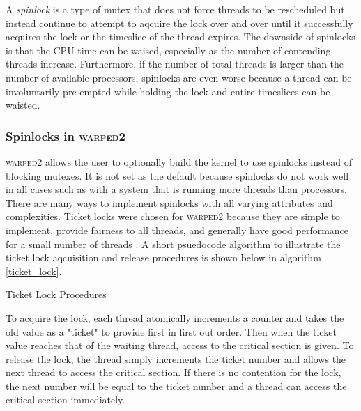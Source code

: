 \documentclass[11pt]{book}
\begin{document}
A \emph{spinlock} is a type of mutex that does not force threads to be rescheduled but
instead continue to attempt to aqcuire the lock over and over until it successfully acquires
the lock or the timeslice of the thread expires. The downside of spinlocks is that the CPU time
can be waised, especially as the number of contending threads increase. Furthermore, if the
number of total threads is larger than the number of available processors, spinlocks are
even worse because a thread can be involuntarily pre-empted while holding the lock and entire
timeslices can be waisted.

\subsubsection{Spinlocks in \textsc{warped2}}

\textsc{warped2} allows the user to optionally build the kernel to use spinlocks instead of
blocking mutexes. It is not set as the default because spinlocks do not work well in all cases
such as with a system that is running more threads than processors.
There are many ways to implement spinlocks with all varying attributes and complexities.
Ticket locks were chosen for \textsc{warped2} because they are simple to implement, provide
fairness to all threads, and generally have good performance for a small number of threads
\cite{lockless-10}. A short psuedocode algorithm to illustrate the ticket lock aqcuisition and
release procedures is shown below in algorithm \ref{ticket_lock}.

\begin{algorithm}
\DontPrintSemicolon
{}
\SetAlgoVlined

    \;


    \caption{Ticket Lock Procedures}\cite{wiki:ticketlock-15}\label{ticket_lock}
\end{algorithm}

\noindent
To acquire the lock, each thread atomically increments a counter and takes the old value as
a "ticket" to provide first in first out order. Then when the ticket value reaches that
of the waiting thread, access to the critical section is given. To release the lock, the thread
simply increments the ticket number and allows the next thread to access the critical section.
If there is no contention for the lock, the next number will be equal to the ticket number and
a thread can access the critical section immediately.
\end{document}
